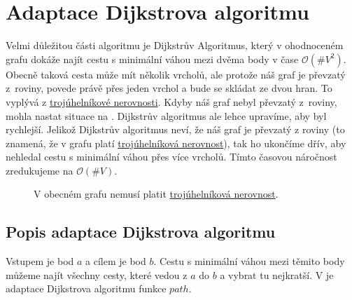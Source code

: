 \section{Adaptace Dijkstrova algoritmu}
\label{sec:dijkstra}

Velmi důležitou části algoritmu je Dijkstrův Algoritmus, který v ohodnoceném grafu dokáže najít cestu s minimální váhou mezi dvěma body v čase $ \mathcal{O}(\#V^2)$. \autocite{benlFormalCorrectnessProofs1999} Obecně taková cesta může mít několik vrcholů, ale protože náš graf je převzatý z~roviny, povede právě přes jeden vrchol a bude se skládat ze dvou hran. To vyplývá z \hyperref[definice:trojuhelnikova_nerovnost]{trojúhelníkové nerovnosti}. Kdyby náš graf nebyl převzatý z~roviny, mohla nastat situace na . Dijkstrův algoritmus ale lehce upravíme, aby byl rychlejší. Jelikož Dijkstrův algoritmus neví, že náš graf je převzatý z roviny (to znamená, že v grafu platí \hyperref[definice:trojuhelnikova_nerovnost]{trojúhelníková nerovnost}), tak ho ukončíme dřív, aby nehledal cestu s minimální váhou přes více vrcholů. Tímto časovou náročnost zredukujeme na $ \mathcal{O}(\#V)$.

\begin{figure}[H]
  \centering
  \caption{V obecném grafu nemusí platit \hyperref[definice:trojuhelnikova_nerovnost]{trojúhelníková nerovnost}.}
  \label{obr:troj_ner_graf}
\end{figure}

\subsection{Popis adaptace Dijkstrova algoritmu}
\label{subsec:dijkstra_adaptace}
  Vstupem je bod $a$ a cílem je bod $b$. Cestu s minimální váhou mezi těmito body můžeme najít všechny cesty, které vedou z $a$ do $b$ a vybrat tu nejkratší. V  je adaptace Dijkstrova algoritmu funkce $path$.

